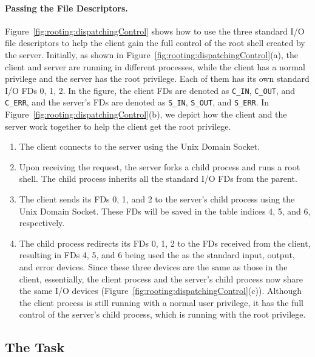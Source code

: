 \paragraph{Passing the File Descriptors.} 
Figure~\ref{fig:rooting:dispatchingControl} shows how to use the three standard I/O file
descriptors to help the client gain the full control of the root shell created by the server. 
Initially, as shown in Figure~\ref{fig:rooting:dispatchingControl}(a), 
the client and server are running in different processes,
while the client has a normal privilege and the server has the root
privilege. Each of them has its own standard I/O FDs 0, 1, 2. 
In the figure, the client FDs are denoted as 
\texttt{C\_IN}, \texttt{C\_OUT}, and \texttt{C\_ERR}, 
and the server’s FDs are denoted as \texttt{S\_IN}, \texttt{S\_OUT}, 
and \texttt{S\_ERR}. 
In Figure~\ref{fig:rooting:dispatchingControl}(b), we depict 
how the client and the server work together to help the client 
get the root privilege. 

\begin{enumerate}
  \item The client connects to the server using the Unix Domain Socket.

  \item Upon receiving the request, the server forks a child process and
	  runs a root shell. The child process inherits 
	  all the standard I/O FDs from the parent.

  \item The client sends its FDs 0, 1, and 2 to the server's child process using the Unix
	  Domain Socket. These FDs will be saved in 
	  the table indices 4, 5, and 6, respectively. 

  \item The child process redirects its FDs 0, 1, 2 to the FDs received
	  from the client, resulting in FDs 4, 5, and 6 being used 
	  the as the standard input, output, and error devices. Since these
	  three devices are the same as those in the client, essentially,
	  the client process and the server's child process now share the
	  same I/O devices
	  (Figure~\ref{fig:rooting:dispatchingControl}(c)). Although the
	  client process is still running with a normal user privilege, it
	  has the full control of the server's child process, which is
	  running with the root privilege.
	  
\end{enumerate}



\subsection{The Task}


